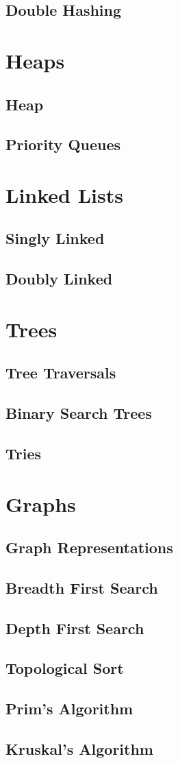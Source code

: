 \documentclass[12pt]{article}
\begin{document}
\subsection{Double Hashing}

\section{Heaps}
\subsection{Heap}
\subsection{Priority Queues}

\section{Linked Lists}
\subsection{Singly Linked}
\subsection{Doubly Linked}

\section{Trees}
\subsection{Tree Traversals}
\subsection{Binary Search Trees}
\subsection{Tries}

\section{Graphs}
\subsection{Graph Representations}
\subsection{Breadth First Search}
\subsection{Depth First Search}
\subsection{Topological Sort}
\subsection{Prim's Algorithm}
\subsection{Kruskal's Algorithm}
\end{document}
